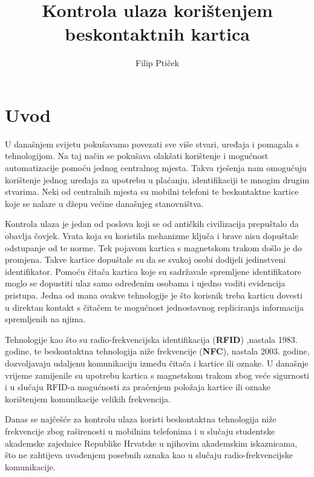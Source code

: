 \documentclass[times, utf8, zavrsni]{fer}
\begin{document}

\title{Kontrola ulaza korištenjem beskontaktnih kartica}

\author{Filip Ptiček}

\maketitle

\izvornik

\zahvala{}

\tableofcontents			

\chapter{Uvod}
U današnjem svijetu pokušavamo povezati sve više stvari, uređaja i pomagala s tehnologijom. Na taj način se pokušava olakšati korištenje i mogućnost automatizacije pomoću jednog centralnog mjesta. Takva rješenja nam omogućuju korištenje jednog uređaja za upotrebu u plaćanju, identifikaciji te mnogim drugim stvarima. Neki od centralnih mjesta su mobilni telefoni te beskontaktne kartice koje se nalaze u džepu većine današnjeg stanovništva.\par
Kontrola ulaza je jedan od poslova koji se od antičkih civilizacija prepuštalo da obavlja čovjek. Vrata koja su koristila mehanizme ključa i brave nisu dopuštale odstupanje od te norme. Tek pojavom kartica s magnetskom trakom došlo je do promjena. Takve kartice dopuštale su da se svakoj osobi dodijeli jedinstveni identifikator. Pomoću čitača kartica koje su sadržavale spremljene identifikatore moglo se dopustiti ulaz samo određenim osobama i ujedno voditi evidencija pristupa. Jedna od mana ovakve tehnologije je što korisnik treba karticu dovesti u direktan kontakt s čitačem te mogućnost jednostavnog repliciranja informacija spremljenih na njima.\par
Tehnologije kao što su radio-frekvencijska identifikacija (\textbf{RFID}) ,nastala 1983. godine, te beskontaktna tehnologija niže frekvencije (\textbf{NFC}), nastala 2003. godine, dozvoljavaju udaljenu komunikaciju između čitača i kartice ili oznake. U današnje vrijeme zamijenile su upotrebu kartica s magnetskom trakom zbog veće sigurnosti i u slučaju RFID-a mogućnosti za praćenjem položaja kartice ili oznake korištenjem komunikacije velikih frekvencija.\par
Danas se najčešće za kontrolu ulaza koristi beskontaktna tehnologija niže frekvencije zbog raširenosti u mobilnim telefonima i u slučaju studentske akademske zajednice Republike Hrvatske u njihovim akademskim iskaznicama, što ne zahtijeva uvođenjem posebnih oznaka kao u slučaju radio-frekvencijske komunikacije.
\end{document}
